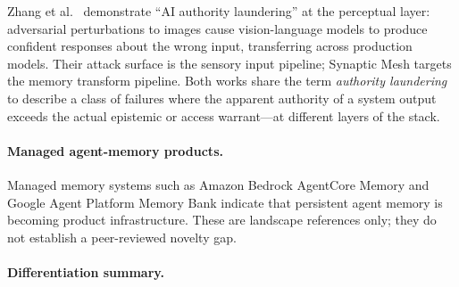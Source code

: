 \documentclass[11pt]{article}
\begin{document}
Zhang et al.~\cite{R21_Zhang2026_AdversarialAuthority} demonstrate ``AI authority
laundering'' at the perceptual layer: adversarial perturbations to images cause
vision-language models to produce confident responses about the wrong input,
transferring across production models. Their attack surface is the sensory input
pipeline; Synaptic Mesh targets the memory transform pipeline. Both works share
the term \emph{authority laundering} to describe a class of failures where the
apparent authority of a system output exceeds the actual epistemic or access
warrant---at different layers of the stack.

\paragraph{Managed agent-memory products.}
Managed memory systems such as Amazon Bedrock AgentCore Memory
\cite{R17_AWS2026_AgentCoreMemory} and Google Agent Platform Memory Bank
\cite{R18_GoogleCloud2026_MemoryBank} indicate that persistent agent memory is
becoming product infrastructure. These are landscape references only; they do not
establish a peer-reviewed novelty gap.

\paragraph{Differentiation summary.}
\end{document}
